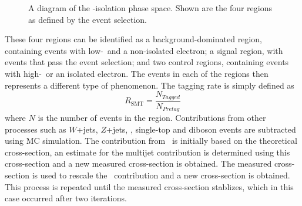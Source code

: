 \begin{figure}[htbp]
  \centering
  \caption{A diagram of the \met-isolation phase space. Shown are the four regions as defined by the event selection.}
  \label{fig:CrossSectionABCDRegions}
\end{figure}

These four regions can be identified as a background-dominated region, containing events with low-\met\ and a non-isolated electron; a signal region, with events that pass the event selection; and two control regions, containing events with high-\met\ or an isolated electron. The events in each of the regions then represents a different type of phenomenon. The tagging rate is simply defined as
%
\begin{equation}
  R_{\textrm{SMT}} = \frac{N_{Tagged}}{N_{Pretag}} 
\end{equation}
%
where $N$ is the number of events in the region. Contributions from other processes such as $W$+jets, $Z$+jets, \ttbar, single-top and diboson events are subtracted using MC simulation. The contribution from \ttbar\ is initially based on the theoretical cross-section, an estimate for the multijet contribution is determined using this cross-section and a new measured cross-section is obtained. The measured cross-section is used to rescale the \ttbar\ contribution and a new cross-section is obtained. This process is repeated until the measured cross-section stablizes, which in this case occurred after two iterations. 

